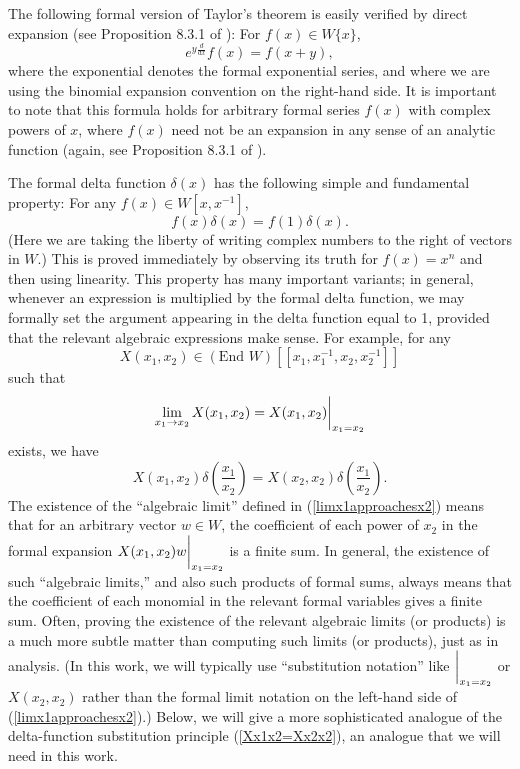 \documentclass[12pt]{article}
\begin{document}
The following formal version of Taylor's theorem is easily verified by
direct expansion (see Proposition 8.3.1 of \cite{FLM2}):  For $f(x)
\in W\{ x\}$,
\begin{equation}\label{formalTaylortheorem}
e^{y \frac{d}{dx}}f(x) = f(x + y),
\end{equation}
where the exponential denotes the formal exponential series, and where
we are using the binomial expansion convention on the right-hand side.
It is important to note that this formula holds for arbitrary formal
series $f(x)$ with complex powers of $x$, where $f(x)$ need not be an
expansion in any sense of an analytic function (again, see Proposition
8.3.1 of \cite{FLM2}).

The formal delta function $\delta(x)$ has the following simple and
fundamental property: For any $f(x)\in W[x, x^{-1}]$,
\begin{equation}
f(x)\delta(x)=f(1)\delta(x).
\end{equation}
(Here we are taking the liberty of writing complex numbers to the
right of vectors in $W$.)  This is proved immediately by observing its
truth for $f(x)=x^n$ and then using linearity.  This property has many
important variants; in general, whenever an expression is multiplied
by the formal delta function, we may formally set the argument
appearing in the delta function equal to 1, provided that the relevant
algebraic expressions make sense.  For example, for any
$$X(x_{1},
x_{2})\in (\mbox{End }W)[[x_{1}, x_{1}^{-1}, x_{2}, x_{2}^{-1}]]$$
such that
\begin{equation}\label{limx1approachesx2}
\lim_{x_{1}\to x_{2}}X(x_{1}, x_{2})=X(x_{1},
x_{2})\bigg\vert_{x_{1}=x_{2}}
\end{equation}
exists, we have
\begin{equation}\label{Xx1x2=Xx2x2}
X(x_{1}, x_{2})\delta\left(\frac{x_{1}}{x_{2}}\right)=X(x_{2}, x_{2})
\delta\left(\frac{x_{1}}{x_{2}}\right).
\end{equation}
The existence of the ``algebraic limit'' defined in
(\ref{limx1approachesx2}) means that for an arbitrary vector $w\in W$,
the coefficient of each power of $x_{2}$ in the formal expansion
$X(x_{1}, x_{2})w\bigg\vert_{x_{1}=x_{2}}$ is a finite sum.  In general,
the existence of such ``algebraic limits,'' and also such products of
formal sums, always means that the coefficient of each monomial in the
relevant formal variables gives a finite sum.  Often, proving the
existence of the relevant algebraic limits (or products) is a much
more subtle matter than computing such limits (or products), just as
in analysis.  (In this work, we will typically use ``substitution
notation'' like $\bigg\vert_{x_{1}=x_{2}}$ or $X(x_{2},x_{2})$ rather than
the formal limit notation on the left-hand side of
(\ref{limx1approachesx2}).)  Below, we will give a more sophisticated
analogue of the delta-function substitution principle
(\ref{Xx1x2=Xx2x2}), an analogue that we will need in this work.
\end{document}
